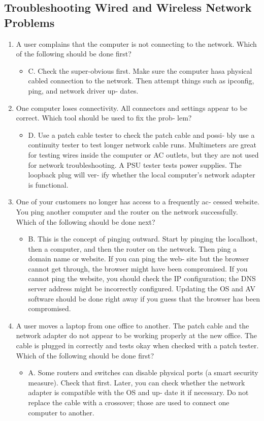 \documentclass{article}
\begin{document}
\subsection{Troubleshooting
Wired and Wireless Network
Problems} 
\begin{enumerate}
    \item A user complains that the computer is not connecting to the
network. Which of the following should be done first?
    \begin{itemize}
        \item C. Check the super-obvious first. Make sure the computer hasa physical cabled connection to the network. Then attempt
things such as ipconfig, ping, and network driver up‐
dates.
    \end{itemize}
    \item One computer loses connectivity. All connectors and settings
appear to be correct. Which tool should be used to fix the prob‐
lem?
    \begin{itemize}
        \item D. Use a patch cable tester to check the patch cable and possi‐
bly use a continuity tester to test longer network cable runs.
Multimeters are great for testing wires inside the computer or
AC outlets, but they are not used for network troubleshooting.
A PSU tester tests power supplies. The loopback plug will ver‐
ify whether the local computer’s network adapter is functional.
    \end{itemize}
    \item One of your customers no longer has access to a frequently ac‐
cessed website. You ping another computer and the router on
the network successfully. Which of the following should be
done next?
    \begin{itemize}
        \item B. This is the concept of pinging outward. Start by pinging the
localhost, then a computer, and then the router on the network.
Then ping a domain name or website. If you can ping the web‐
site but the browser cannot get through, the browser might
have been compromised. If you cannot ping the website, you
should check the IP configuration; the DNS server address
might be incorrectly configured. Updating the OS and AV
software should be done right away if you guess that the
browser has been compromised.
    \end{itemize}
    \item A user moves a laptop from one office to another. The patch
cable and the network adapter do not appear to be working
properly at the new office. The cable is plugged in correctly
and tests okay when checked with a patch tester. Which of the
following should be done first?
    \begin{itemize}
        \item A. Some routers and switches can disable physical ports (a
smart security measure). Check that first. Later, you can check
whether the network adapter is compatible with the OS and up‐
date it if necessary. Do not replace the cable with a crossover;
those are used to connect one computer to another.
    \end{itemize}
\end{enumerate}
\end{document}
